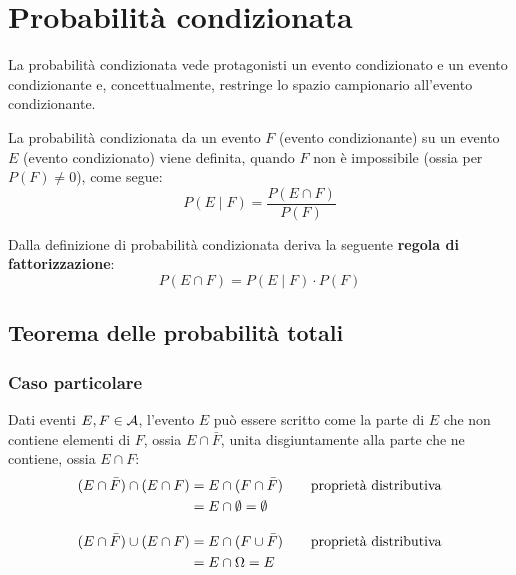 %
%
%
%


\section{Probabilità condizionata}
La probabilità condizionata vede protagonisti un evento condizionato e un evento condizionante e, concettualmente, restringe lo spazio campionario all'evento condizionante.

\begin{defin}
	La probabilità condizionata da un evento $F$ (evento condizionante) su un evento $E$ (evento condizionato) viene definita, quando $F$ non è impossibile (ossia per $P(F)\neq 0$), come segue:
	\begin{equation*}
		P(E\mid F)=\frac{P(E \cap F)}{P(F)}
	\end{equation*}
\end{defin}

Dalla definizione di probabilità condizionata deriva la seguente \textbf{regola di fattorizzazione}:
\begin{equation} \label{eq:regfatt}
	P(E \cap F)=P(E\mid F)\cdot P(F)
\end{equation}



\subsection{Teorema delle probabilità totali}

\subsubsection{Caso particolare}
Dati eventi $E, F\in \mathcal A$, l'evento $E$ può essere scritto come la parte di $E$ che non contiene elementi di $F$, ossia $E\cap \bar F$, unita disgiuntamente alla parte che ne contiene, ossia $E \cap F$:
\begin{align*}
	(E \cap \bar F) \cap (E \cap F) & = E \cap (F \cap \bar F)& \quad & \text{proprietà distributiva}  \\
	                                & = E \cap \emptyset = \emptyset                       \\[2ex]
	(E \cap \bar F) \cup (E \cap F) & = E \cap (F \cup \bar F) & \quad & \text{proprietà distributiva} \\
	                                & = E \cap \Omega = E
\end{align*}

